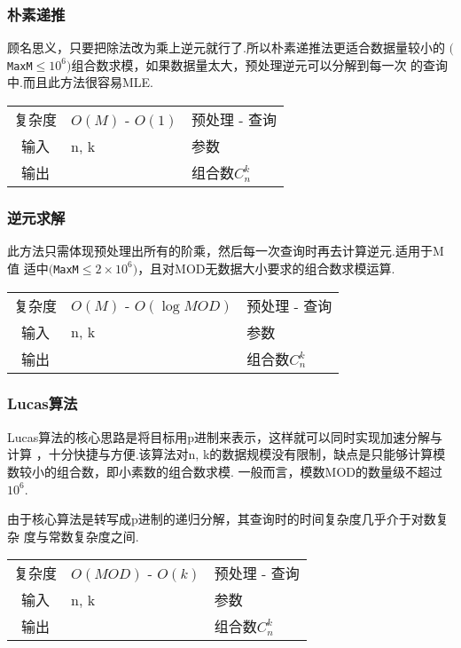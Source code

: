         \subsubsection{朴素递推}\small
顾名思义，只要把除法改为乘上逆元就行了.所以朴素递推法更适合数据量较小的
$(${\tt MaxM}$ \leq 10^6)$组合数求模，如果数据量太大，预处理逆元可以分解到每一次
的查询中.而且此方法很容易MLE.

\begin{longtable}{|c|l|l|}
复杂度 & $O(M)$ - $O(1)$ & 预处理 - 查询 \\
输入 & n, k & 参数 \\
输出 &  & 组合数$C^{k}_{n}$ \\
\end{longtable}



        \subsubsection{逆元求解}\small
此方法只需体现预处理出所有的阶乘，然后每一次查询时再去计算逆元.适用于M值
适中$(${\tt MaxM}$ \leq 2 \times 10^6)$，且对MOD无数据大小要求的组合数求模运算.

\begin{longtable}{|c|l|l|}
复杂度 & $O(M)$ - $O(\log MOD)$ & 预处理 - 查询 \\
输入 & n, k & 参数 \\
输出 &  & 组合数$C^{k}_{n}$ \\
\end{longtable}



        \subsubsection{Lucas算法}\small
Lucas算法的核心思路是将目标用p进制来表示，这样就可以同时实现加速分解与计算
，十分快捷与方便.该算法对n, k的数据规模没有限制，缺点是只能够计算模数较小的组合数，即小素数的组合数求模.
一般而言，模数MOD的数量级不超过$10^6$.

由于核心算法是转写成p进制的递归分解，其查询时的时间复杂度几乎介于对数复杂
度与常数复杂度之间.

\begin{longtable}{|c|l|l|}
复杂度 & $O(MOD)$ - $O(k)$ & 预处理 - 查询 \\
输入 & n, k & 参数 \\
输出 &  & 组合数$C^{k}_{n}$ \\
\end{longtable}






